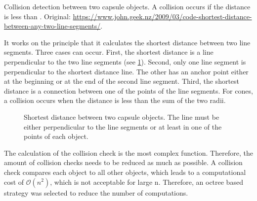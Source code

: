 %
\begin{lstfloat}[!t]
    \caption[]{Collision detection between two capsule objects. A collision occurs if the distance is less than . Original: \href{https://www.john.geek.nz/2009/03/code-shortest-distance-between-any-two-line-segments/}{https://www.john.geek.nz/2009/03/code-shortest-distance-between-any-two-line-segments/}.}
    \label{alg:pseudocodeCollisionDetection}
\end{lstfloat}
%
It works on the principle that it calculates the shortest distance between two line segments.
Three cases can occur.
First, the shortest distance is a line perpendicular to the two line segments (see \cref{fig:shortDist}).
Second, only one line segment is perpendicular to the shortest distance line.
The other has an anchor point either at the beginning or at the end of the second line segment.
Third, the shortest distance is a connection between one of the points of the line segments.
For cones, a collision occurs when the distance is less than the sum of the two radii.
\par
%
\begin{figure}[!t]
    \centering
    \def\tikzheight{0.5\textwidth}
	\caption[]{Shortest distance between two capsule objects. The line must be either perpendicular to the line segments or at least in one of the points of each object.}
	\label{fig:shortDist}
\end{figure}
%
The calculation of the collision check is the most complex function.
Therefore, the amount of collision checks needs to be reduced as much as possible.
A collision check compares each object to all other objects, which leads to a computational cost of $\mathcal{O}(n^{2})$, which is not acceptable for large n.
Therefore, an octree based strategy was selected to reduce the number of computations.
%
%
%
